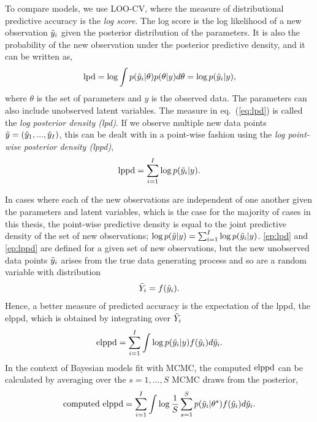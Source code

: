 To compare models, we use LOO-CV, where the measure of distributional predictive accuracy is the \emph{log score}. The log score is the log likelihood of a new observation $\Tilde{y}_i$ given the posterior distribution of the parameters. It is also the probability of the new observation under the posterior predictive density, and it can be written as,
\begin{equation} \label{eq:lpd}
    \hbox{lpd} = \log \int p(\Tilde{y}_i|\theta)p(\theta|y)d\theta = \log p(\Tilde{y}_i | y),
\end{equation}
where $\theta$ is the set of parameters and $y$ is the observed data. The parameters can also include unobserved latent variables. The measure in eq.~(\ref{eq:lpd}) is called the \textit{log posterior density (lpd)}. If we observe multiple new data points $\Tilde{y} = (\Tilde{y}_1, ..., \Tilde{y}_I)$, this can be dealt with in a point-wise fashion using the \textit{log point-wise posterior density (lppd)},
\begin{equation} \label{eq:lppd}
    \hbox{lppd} = \sum^I_{i = 1} \log p(\Tilde{y}_i|y).
\end{equation}

In cases where each of the new observations are independent of one another given the parameters and latent variables, which is the case for the majority of cases in this thesis, the point-wise predictive density is equal to the joint predictive density of the set of new observations; $\log p(\Tilde{y}|y) = {\sum}^I_{i = 1} \log p(\Tilde{y}_i|y)$. \ref{ep:lpd} and \ref{ep:lppd} are defined for a given set of new observations, but the new unobserved data points $\Tilde{y}_i$ arises from the true data generating process and so are a random variable with distribution
\begin{equation} \label{ep:y_tild_dist}
    \Tilde{Y}_i = f(\Tilde{y}_i).
\end{equation}
Hence, a better measure of predicted accuracy is the expectation of the lppd, the elppd, which is obtained by integrating over $\Tilde{Y}_i$
\begin{equation} \label{ep:elppd}
    \hbox{elppd} = \sum^I_{i = 1} \int \log p(\Tilde{y}_i|y)f(\Tilde{y}_i) d\Tilde{y}_i.
\end{equation}
In the context of Bayesian models fit with MCMC, the computed $\hbox{elppd}$ can be calculated by averaging over the $s = 1, ..., S$ MCMC draws from the posterior,
\begin{equation} \label{ep:computed_elppd}
   \hbox{computed elppd} = \sum^I_{i = 1} \int \log \frac{1}{S} \sum^S_{s = 1} p(\Tilde{y}_i|\theta^s)f(\Tilde{y}_i) d\Tilde{y}_i.
\end{equation}

